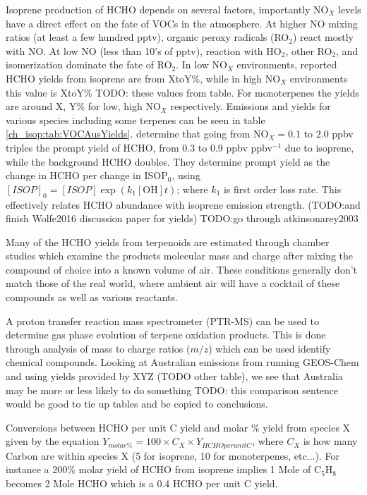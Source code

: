     Isoprene production of HCHO depends on several factors, importantly NO$_X$ levels have a direct effect on the fate of VOCs in the atmosphere.
    At higher NO mixing ratios (at least a few hundred pptv), organic peroxy radicals (RO$_2$) react mostly with NO. 
    At low NO (less than 10's of pptv), reaction with HO$_2$, other RO$_2$, and isomerization dominate the fate of RO$_2$.
    In low NO$_X$ environments, reported HCHO yields from isoprene are from XtoY\%, while in high NO$_X$ environments this value is XtoY\% TODO: these values from table.
    For monoterpenes the yields are around X, Y\% for low, high NO$_X$ respectively.
    Emissions and yields for various species including some terpenes can be seen in table \ref{ch_isop:tab:VOCAusYields}.
    \citet{Wolfe2016} determine that going from NO$_X = 0.1$ to $2.0$ ppbv triples the prompt yield of HCHO, from 0.3 to 0.9 ppbv ppbv$^{-1}$ due to isoprene, while the background HCHO doubles.
    They determine prompt yield as the change in HCHO per change in ISOP$_0$, using $[ISOP]_0=[ISOP]\exp(k_1[\mathrm{OH}]t)$; where $k_1$ is first order loss rate.
    This effectively relates HCHO abundance with isoprene emission strength.
    (TODO:and finish Wolfe2016 discussion paper for yields)
    TODO:go through atkinsonarey2003
    
    Many of the HCHO yields from terpenoids are estimated through chamber studies which examine the products molecular mass and charge after mixing the compound of choice into a known volume of air.
    These conditions generally don't match those of the real world, where ambient air will have a cocktail of these compounds as well as various reactants.
    
    A proton transfer reaction mass spectrometer (PTR-MS) can be used to determine gas phase evolution of terpene oxidation products.
    This is done through analysis of mass to charge ratios ($m/z$) which can be used identify chemical compounds.
    Looking at Australian emissions from running GEOS-Chem and using yields provided by XYZ (TODO other table), we see that Australia may be more or less likely to do something TODO: this comparison sentence would be good to tie up tables and be copied to conclusions.
    
    Conversions between HCHO per unit C yield and molar \% yield from species X given by the equation $ Y_{molar \%} = 100 \times C_X \times Y_{HCHO per unit C} $, where $C_X$ is how many Carbon are within species X (5 for isoprene, 10 for monoterpenes, etc...).
    For instance a 200\% molar yield of HCHO from isoprene implies 1 Mole of C$_5$H$_8$ becomes 2 Mole HCHO which is a 0.4 HCHO per unit C yield.
    
